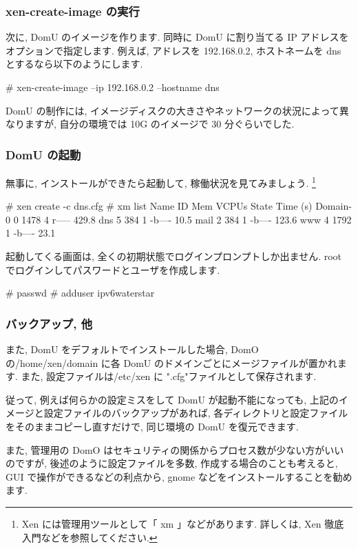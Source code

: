 \documentclass[mingoth,a4paper]{jsarticle}
\begin{document}
\subsubsection{xen-create-image の実行}
次に, DomU のイメージを作ります. 同時に DomU に割り当てる IP アドレスをオプションで指定します. 例えば, アドレスを 192.168.0.2, ホストネームを dns とするなら以下のようにします.
\begin{commandline}
# xen-create-image --ip 192.168.0.2 --hostname dns
\end{commandline}
DomU の制作には, イメージディスクの大きさやネットワークの状況によって異なりますが, 自分の環境では 10G のイメージで 30 分ぐらいでした.

\subsubsection{DomU の起動}
無事に, インストールができたら起動して, 稼働状況を見てみましょう.
\footnote{Xen には管理用ツールとして「 xm 」などがあります. 詳しくは, Xen 徹底入門などを参照してください. }
\begin{commandline}
# xen create -c dns.cfg
# xm list
 Name                                        ID   Mem VCPUs      State   Time (s)
 Domain-0                                     0  1478     4     r-----    429.8
 dns                                          5   384     1     -b----     10.5
 mail                                         2   384     1     -b----    123.6
 www                                          4  1792     1     -b----     23.1
\end{commandline}
起動してくる画面は, 全くの初期状態でログインプロンプトしか出ません. root でログインしてパスワードとユーザを作成します.
\begin{commandline}
# passwd
# adduser ipv6waterstar
\end{commandline}
\subsubsection{バックアップ, 他}
また, DomU をデフォルトでインストールした場合, DomO の/home/xen/domain に各 DomU のドメインごとにメージファイルが置かれます. また, 設定ファイルは/etc/xen に  ".cfg"ファイルとして保存されます.

従って, 例えば何らかの設定ミスをして DomU が起動不能になっても, 上記のイメージと設定ファイルのバックアップがあれば, 各ディレクトリと設定ファイルをそのままコピーし直すだけで, 同じ環境の DomU を復元できます.

また, 管理用の DomO はセキュリティの関係からプロセス数が少ない方がいいのですが, 後述のように設定ファイルを多数, 作成する場合のことも考えると, GUI で操作ができるなどの利点から, gnome などをインストールすることを勧めます.
\end{document}
